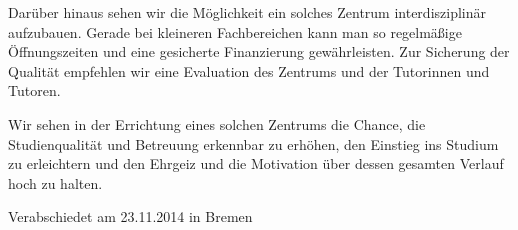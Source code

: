 \documentclass[DIV=calc]{scrartcl}
\begin{document}
Darüber hinaus sehen wir die Möglichkeit ein solches Zentrum interdisziplinär aufzubauen. Gerade bei kleineren Fachbereichen kann man so regelmäßige Öffnungszeiten und eine gesicherte Finanzierung gewährleisten. 
Zur Sicherung der Qualität empfehlen wir eine Evaluation des Zentrums und der Tutorinnen und Tutoren. 

Wir sehen in der Errichtung eines solchen Zentrums die Chance, die Studienqualität und Betreuung erkennbar zu erhöhen, den Einstieg ins Studium zu erleichtern und den Ehrgeiz und die Motivation über dessen gesamten Verlauf hoch zu halten.




\begin{flushright}
Verabschiedet am 23.11.2014 in Bremen
\end{flushright}
\end{document}
